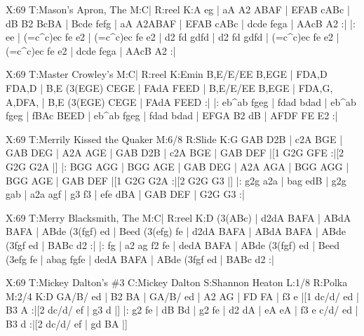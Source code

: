 \documentclass{article}
\begin{document}
\begin{abc}[name]
X:69
T:Mason's Apron, The
M:C|
R:reel
K:A
eg | aA A2 ABAF | EFAB cABc | dB B2 BcBA | Bcde fefg |
aA A2ABAF | EFAB cABc | dcde fega | AAcB A2 :|
|: ee | (=c^c)ec fe e2 | (=c^c)ec fe e2 | d2 fd gdfd | d2 fd gdfd |
(=c^c)ec fe e2 | (=c^c)ec fe e2 | dcde fega | AAcB A2 :|
\end{abc}

\begin{abc}[name]
X:69
T:Master Crowley's
M:C|
R:reel
K:Emin
B,E/E/EE B,EGE | FDA,D FDA,D | B,E (3(EGE) CEGE | FAdA FEED |
B,E/E/EE B,EGE | FDA,G, A,DFA, | B,E (3(EGE) CEGE | FAdA FEED :|
|: eb^ab fgeg | fdad bdad | eb^ab fgeg | fBAc BEED |
eb^ab fgeg | fdad bdad | EFGA B2 dB | AFDF FE E2 :|
\end{abc}

\begin{abc}[name]
X:69
T:Merrily Kissed the Quaker
M:6/8
R:Slide
K:G
GAB D2B | c2A BGE | GAB DEG | A2A AGE |
GAB D2B | c2A BGE | GAB DEF |[1 G2G GFE :|[2 G2G G2A |]
|: BGG AGG | BGG AGE | GAB DEG | A2A AGA |
BGG AGG | BGG AGE | GAB DEF |[1 G2G G2A :|[2 G2G G3 |]
|: g2g a2a | bag edB | g2g gab | a2a agf |
g3 f3 | efe dBA | GAB DEF | G2G G3 :|
\end{abc}

\begin{abc}[name]
X:69
T:Merry Blacksmith, The
M:C|
R:reel
K:D
(3(ABc) | d2dA BAFA | ABdA BAFA | ABde (3(fgf) ed | Beed (3(efg) fe |
d2dA BAFA | ABdA BAFA | ABde (3fgf ed | BABc d2 :|
|: fg | a2 ag f2 fe | dedA BAFA | ABde (3(fgf) ed | Beed (3efg fe |
abag fgfe | dedA BAFA |  ABde (3fgf ed | BABc d2 :|
\end{abc}

\begin{abc}[name]
X:69
T:Mickey Dalton's \#3
C:Mickey Dalton
S:Shannon Heaton
L:1/8
R:Polka
M:2/4
K:D
GA/B/ ed | B2 BA | GA/B/ ed | A2 AG |
FD FA | f3 e |[1 dc/d/ ed | B3 A :|[2 dc/d/ ef | g3 d |]
|: g2 fe | dB Bd | g2 fe | d2 dA |
eA eA | f3 e c/d/ ed | B3 d :|[2 dc/d/ ef | gd BA |]
\end{abc}
\end{document}
